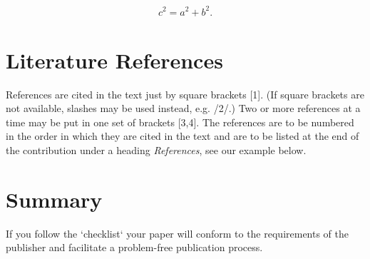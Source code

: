 \documentclass{ttp}
\begin{document}
\begin{eqnarray}
c^2 = a^2 + b^2.
\end{eqnarray}

\section{Literature References}

\noindent References are cited in the text just by square brackets [1].
 (If square brackets are not available, slashes may be used instead, e.g. /2/.)
Two or more references at a time may be put in one set of brackets [3,4]. The
references are to be numbered in the order in which they are cited in the text and
are to be listed at the end of the contribution under a heading \textit{References},
see our example below.

\section{Summary}
\noindent If you follow the `checklist` your paper will conform to the requirements
 of the publisher and facilitate a problem-free publication process.
\end{document}
